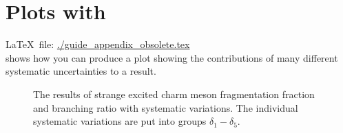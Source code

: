 
\chapter{Plots with \Package{\TikZ}}%
\label{sec:app:tikz}

\LaTeX\ file: \url{./guide_appendix_obsolete.tex}\\[1ex]
\noindent
{} shows how you can produce a plot showing
the contributions of many different systematic uncertainties to a
result.

\begin{figure}[htbp]
  \centering
  
  \caption[Strange $D^{**}$ systematics, fragmentation fractions]{The
    results of strange excited charm meson fragmentation fraction and
    branching ratio with systematic variations.  The individual
    systematic variations are put into groups $\delta_1-\delta_5$.}%
  \label{fig:tikz:syst}
\end{figure}

